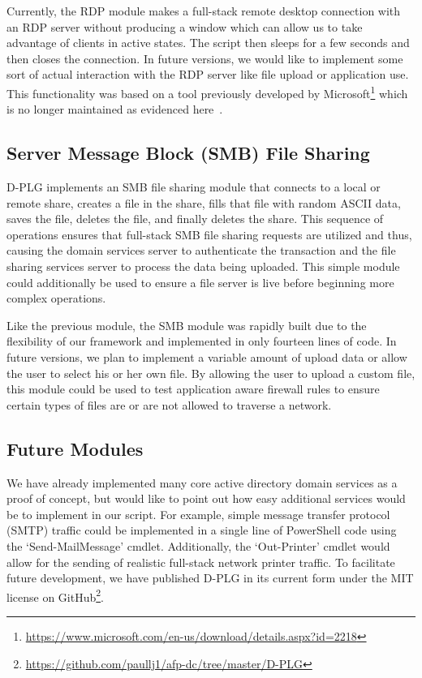 Currently, the RDP module makes a full-stack remote desktop connection with an
RDP server without producing a window which can allow us to take advantage of
clients in active states.  The script then sleeps for a few seconds and then
closes the connection.  In future versions, we would like to implement some
sort of actual interaction with the RDP server like file upload or application
use.  This functionality was based on a tool previously developed by
Microsoft\footnote{\url{https://www.microsoft.com/en-us/download/details.aspx?id=2218}}
which is no longer maintained as evidenced here~\cite{szeto12}.

\subsection{Server Message Block (SMB) File Sharing}
\noindent D-PLG implements an SMB file sharing module that connects to a local
or remote share, creates a file in the share, fills that file with random ASCII
data, saves the file, deletes the file, and finally deletes the share.  This
sequence of operations ensures that full-stack SMB file sharing requests are
utilized and thus, causing the domain services server to authenticate the
transaction and the file sharing services server to process the data being
uploaded.  This simple module could additionally be used to ensure a file
server is live before beginning more complex operations.

Like the previous module, the SMB module was rapidly built due to the
flexibility of our framework and implemented in only fourteen lines of code.
In future versions, we plan to implement a variable amount of upload data or
allow the user to select his or her own file.  By allowing the user to upload a
custom file, this module could be used to test application aware firewall rules
to ensure certain types of files are or are not allowed to traverse a network.

\subsection{Future Modules} 
\noindent We have already implemented many core active directory domain
services as a proof of concept, but would like to point out how easy additional
services would be to implement in our script.  For example, simple message
transfer protocol (SMTP) traffic could be implemented in a single line of
PowerShell code using the `Send-MailMessage' cmdlet.  Additionally, the
`Out-Printer' cmdlet would allow for the sending of realistic full-stack
network printer traffic.  To facilitate future development, we have published
D-PLG in its current form under the MIT license on
GitHub\footnote{\url{https://github.com/paullj1/afp-dc/tree/master/D-PLG}}.

